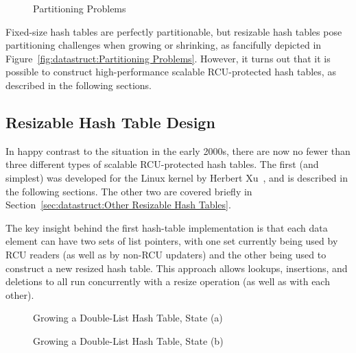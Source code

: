 \begin{figure}[tb]
\centering
{}
\caption{Partitioning Problems}
\end{figure}

Fixed-size hash tables are perfectly partitionable, but resizable hash
tables pose partitioning challenges when growing or shrinking, as
fancifully depicted in
Figure~\ref{fig:datastruct:Partitioning Problems}.
However, it turns out that it is possible to construct high-performance
scalable RCU-protected hash tables, as described in the following sections.

\subsection{Resizable Hash Table Design}
\label{sec:datastruct:Resizable Hash Table Design}

In happy contrast to the situation in the early 2000s, there are now
no fewer than three different types of scalable RCU-protected hash
tables.
The first (and simplest) was developed for the Linux kernel by
Herbert Xu~\cite{HerbertXu2010RCUResizeHash}, and is described in the
following sections.
The other two are covered briefly in
Section~\ref{sec:datastruct:Other Resizable Hash Tables}.

The key insight behind the first hash-table implementation is that
each data element can have two sets of list pointers, with one set
currently being used by RCU readers (as well as by non-RCU updaters)
and the other being used to construct a new resized hash table.
This approach allows lookups, insertions, and deletions to all run
concurrently with a resize operation (as well as with each other).

\begin{figure}[tb]
\centering
{}
\caption{Growing a Double-List Hash Table, State (a)}
\label{fig:datastruct:Growing a Double-List Hash Table, State (a)}
\end{figure}

\begin{figure}[tb]
\centering
{}
\caption{Growing a Double-List Hash Table, State (b)}
\label{fig:datastruct:Growing a Double-List Hash Table, State (b)}
\end{figure}

